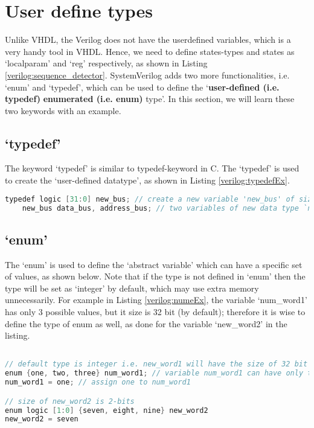 


\section{User define types}
Unlike VHDL, the Verilog does not have the userdefined variables, which is a very handy tool in VHDL. Hence, we need to define states-types and states as `localparam' and `reg' respectively, as shown in Listing \ref{verilog:sequence_detector}. SystemVerilog adds two more functionalities, i.e. `enum' and `typedef', which can be used to define the `\textbf{user-defined (i.e. typedef)} \textbf{enumerated (i.e. enum)} type'. In this section, we will learn these two keywords with an example. 

\subsection{`typedef'}
The keyword `typedef' is similar to typedef-keyword in C. The `typedef' is used to create the `user-defined datatype', as shown in Listing \ref{verilog:typedefEx}. 

\begin{lstlisting}[language=Verilog, caption={`typedef' example}, label={verilog:typedefEx}]
	typedef logic [31:0] new_bus; // create a new variable 'new_bus' of size 32
	new_bus data_bus, address_bus; // two variables of new data type `new_bus'
\end{lstlisting}

\subsection{`enum'}
The `enum' is used to define the `abstract variable' which can have a specific set of values, as shown below. Note that if the type is not defined in `enum' then the type will be set as `integer' by default, which may use extra memory unnecessarily. For example in Listing \ref{verilog:numeEx}, the variable `num\_word1' has only 3 possible values, but it size is 32 bit (by default); therefore it is wise to define the type of enum as well, as done for the variable `new\_word2' in the listing. 
\begin{lstlisting}[language=Verilog, caption={`enum' example}, label={verilog:numeEx}]

// default type is integer i.e. new_word1 will have the size of 32 bit
enum {one, two, three} num_word1; // variable num_word1 can have only three types of values
num_word1 = one; // assign one to num_word1

// size of new_word2 is 2-bits
enum logic [1:0] {seven, eight, nine} new_word2
new_word2 = seven
\end{lstlisting}

